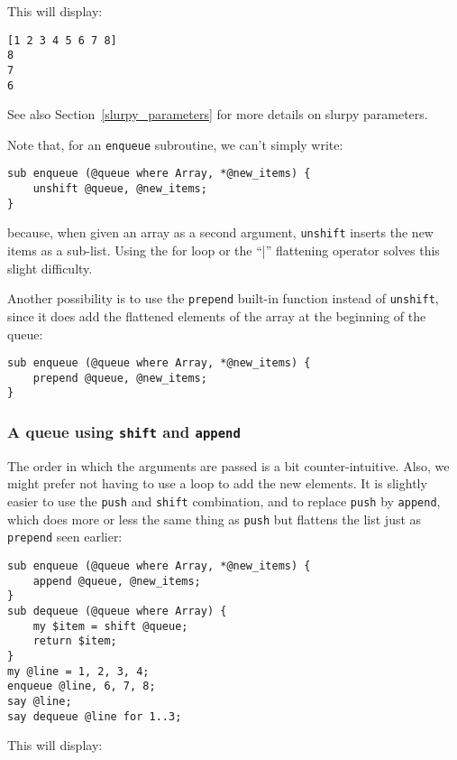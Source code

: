 This will display:

\begin{verbatim}
[1 2 3 4 5 6 7 8]
8
7
6
\end{verbatim}

See also Section~\ref{slurpy_parameters} for more details 
on slurpy parameters.

Note that, for an \verb'enqueue' subroutine, we can't simply 
write:
\begin{verbatim}
sub enqueue (@queue where Array, *@new_items) {
    unshift @queue, @new_items;
}
\end{verbatim}
%
because, when given an array as a second argument, 
{\tt unshift} inserts the new items as a sub-list. 
Using the for loop or the ``|'' flattening operator 
solves this slight difficulty. 

Another possibility is to use the {\tt prepend} built-in 
function instead of {\tt unshift}, since it does add 
the flattened elements of the array at the beginning 
of the queue:

\begin{verbatim}
sub enqueue (@queue where Array, *@new_items) {
    prepend @queue, @new_items;
}
\end{verbatim}

\subsubsection{A queue using {\tt shift} and {\tt append}}

The order in which the arguments are passed is a bit 
counter-intuitive. Also, we might prefer not having to use 
a loop to add the new elements. It is slightly easier to use the {\tt push} 
and {\tt shift} combination, and to replace {\tt push} by 
{\tt append}, which does more or less the same thing as 
{\tt push} but flattens the list just as {\tt prepend} 
seen earlier:

\begin{verbatim}
sub enqueue (@queue where Array, *@new_items) {
    append @queue, @new_items;
}
sub dequeue (@queue where Array) {
    my $item = shift @queue;
    return $item;
}
my @line = 1, 2, 3, 4;
enqueue @line, 6, 7, 8;
say @line;
say dequeue @line for 1..3;
\end{verbatim}

This will display:


